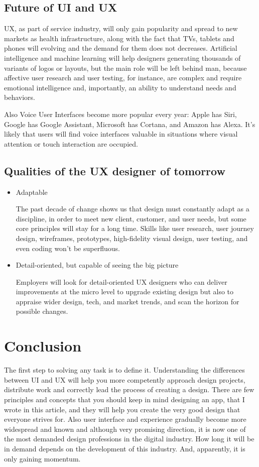 \documentclass[10pt,twoside,english,a4paper]{article}
\begin{document}
\subsection{Future of UI and UX}
UX, as part of service industry, will only gain popularity and spread to new markets as health infrastructure, along with the fact that TVs, tablets and phones will evolving and the demand for them does not decreases. Artificial intelligence and machine learning will help designers generating thousands of variants of logos or layouts, but the main role will be left behind man, because affective user research and user testing, for instance, are complex and require emotional intelligence and, importantly, an ability to understand needs and behaviors.

Also Voice User Interfaces become more popular every year:  Apple has Siri, Google has Google Assistant, Microsoft has Cortana, and Amazon has Alexa. It’s likely that users will find voice interfaces valuable in situations where visual attention or touch interaction are occupied.
\cite{FutureDesign}
\subsection{Qualities of the UX designer of tomorrow}
\begin{itemize}
\item Adaptable

The past decade of change shows us that design must constantly adapt as a discipline, in order to meet new client, customer, and user needs, but some core principles will stay for a long time. Skills like user research, user journey design, wireframes, prototypes, high-fidelity visual design, user testing, and even coding won't be superfluous.
\item Detail-oriented, but capable of seeing the big picture

Employers will look for detail-oriented UX designers who can deliver improvements at the micro level to upgrade existing design but also to appraise wider design, tech, and market trends, and scan the horizon for possible changes.\cite{DesignerTomorrow}
\end{itemize}

\section{Conclusion}
The first step to solving any task is to define it. Understanding the
differences between UI and UX will help you more competently approach design projects, distribute work and correctly lead the process of creating a design. There are few principles and concepts that you should keep in mind designing an app, that I wrote in this article, and they will help you create the very good design that everyone strives for.	\cite{Kuusinen2014} Also user interface and experience gradually become more widespread and known and although very promising direction, it is now one of the most demanded design professions in the digital industry. How long it will be in demand depends on the development of this industry. And, apparently, it is only gaining momentum.
\end{document}
